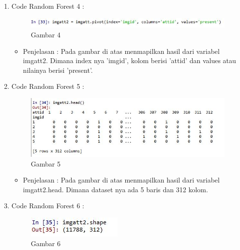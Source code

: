 \begin{enumerate}
\begin{itemize}
\par
\end{itemize}
\item Code Random Forest 4 :
\par
\begin{figure}[ht]
\centering
\includegraphics[scale=0.7]{figures/AFS/4d.jpg}
\caption{Gambar 4}
\label{contoh}
\end{figure}
\par
\begin{itemize}
\item Penjelasan : Pada gambar di atas menmapilkan hasil dari variabel imgatt2. Dimana index nya 'imgid', kolom berisi 'attid' dan values atau nilainya berisi 'present'.
\par
\par
\end{itemize}
\item Code Random Forest 5 :
\par
\begin{figure}[ht]
\centering
\includegraphics[scale=0.7]{figures/AFS/4e.jpg}
\caption{Gambar 5}
\label{contoh}
\end{figure}
\par
\begin{itemize}
\item Penjelasan : Pada gambar di atas menmapilkan hasil dari variabel imgatt2.head. Dimana dataset nya ada 5 baris dan 312 kolom.
\par
\par
\end{itemize}
\item Code Random Forest 6 :
\par
\begin{figure}[ht]
\centering
\includegraphics[scale=0.7]{figures/AFS/4f.jpg}
\caption{Gambar 6}
\label{contoh}

\end{figure}
\end{enumerate}
